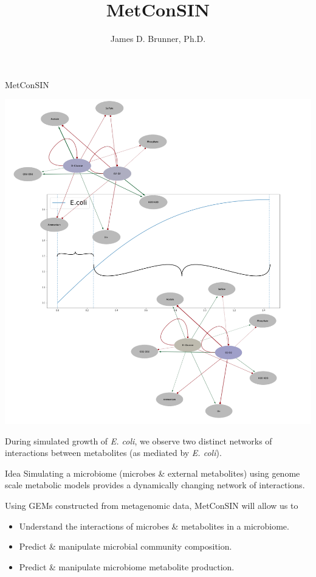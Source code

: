 \documentclass[aspectratio=1610]{beamer}
\institute[LANL]{Los Alamos National Laboratory}
\title{MetConSIN}
\subtitle{}
\author[Brunner]{James D. Brunner, Ph.D.}
\begin{document}
\maketitle
\begin{frame}{MetConSIN}
\begin{minipage}{0.45\textwidth}
\begin{center}
\includegraphics[scale =0.18]{metabolites.pdf}
\end{center}

{\tiny During simulated growth of \emph{E. coli}, we observe two distinct networks of interactions between metabolites (as mediated by \emph{E. coli}).}

\end{minipage}\hspace{1cm}
\begin{minipage}{0.45\textwidth}
\begin{block}{Idea}
Simulating a microbiome (microbes \& external metabolites) using genome scale metabolic models provides a dynamically changing network of interactions.
\end{block}
\vspace{0.4cm}

{\small Using GEMs constructed from metagenomic data, MetConSIN will allow us to

\begin{itemize}
\item Understand the interactions of microbes \& metabolites in a microbiome.
\item Predict \& manipulate microbial community composition.
\item Predict \& manipulate microbiome metabolite production.
\end{itemize}
}
\end{minipage}

\end{frame}
\end{document}
